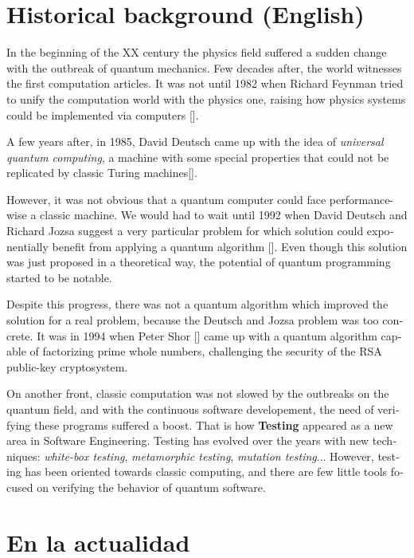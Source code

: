 \section{Historical background (English)}
\begin{otherlanguage}{british}
In the beginning of the XX century the physics field suffered a sudden change with the outbreak of quantum mechanics. Few decades after, the world witnesses the first computation articles. It was not until 1982 when Richard Feynman tried to unify the computation world with the physics one, raising how physics systems could be implemented via computers [\cite{feynman1982simulating}].

A few years after, in 1985, David Deutsch came up with the idea of \textit{universal quantum computing}, a machine with some special properties that could not be replicated by classic Turing machines[\cite{deutsch1985quantum}].

However, it was not obvious that a quantum computer could face performance-wise a classic machine. We would had to wait until 1992 when David Deutsch and Richard Jozsa suggest a very particular problem for which solution could exponentially benefit from applying a quantum algorithm [\cite{deutsch1992rapid}]. Even though this solution was just proposed in a theoretical way, the potential of quantum programming started to be notable.

Despite this progress, there was not a quantum algorithm which improved the solution for a real problem, because the Deutsch and  Jozsa problem was too concrete. It was in 1994 when Peter Shor [\cite{shor1994algorithms}] came up with a quantum algorithm capable of factorizing prime whole numbers, challenging the security of the RSA public-key cryptosystem.

On another front, classic computation was not slowed by the outbreaks on the quantum field, and with the continuous software developement, the need of verifying these programs suffered a boost.
That is how \textbf{Testing} appeared as a new area in Software Engineering. Testing has evolved over the years with new techniques: \textit{white-box testing}, \textit{metamorphic testing}, \textit{mutation testing}... However, testing has been oriented towards classic computing, and there are few little tools focused on verifying the behavior of quantum software.
\end{otherlanguage}

\section{En la actualidad}

